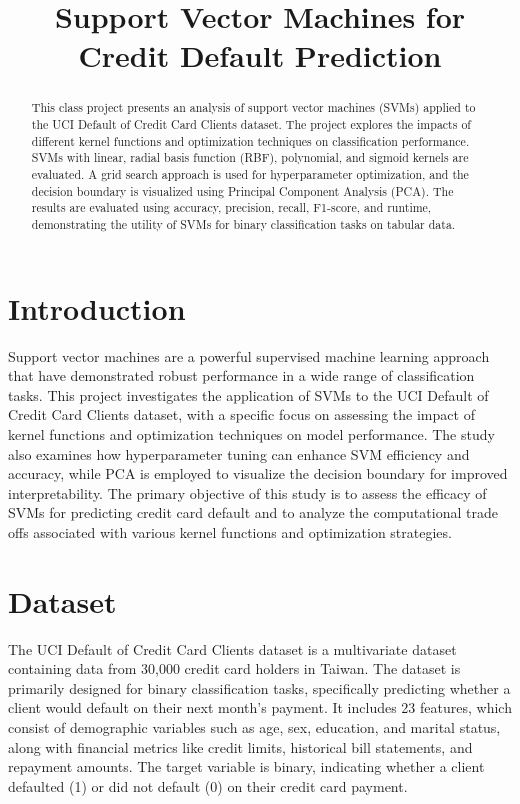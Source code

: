 \documentclass{article}
\begin{document}
\title{Support Vector Machines for Credit Default Prediction}


\maketitle

\begin{abstract}
This class project presents an analysis of support vector machines (SVMs) applied to the UCI Default of Credit Card Clients dataset. 
The project explores the impacts of different kernel functions and optimization techniques on classification performance. 
SVMs with linear, radial basis function (RBF), polynomial, and sigmoid kernels are evaluated. 
A grid search approach is used for hyperparameter optimization, and the decision boundary is visualized using Principal Component Analysis (PCA). 
The results are evaluated using accuracy, precision, recall, F1-score, and runtime, demonstrating the utility of SVMs for binary classification tasks on tabular data.
\end{abstract}

\section{Introduction}
Support vector machines are a powerful supervised machine learning approach that have demonstrated robust performance in a wide range of classification tasks. 
This project investigates the application of SVMs to the UCI Default of Credit Card Clients dataset, with a specific focus on assessing the impact of kernel functions 
and optimization techniques on model performance. The study also examines how hyperparameter tuning can enhance SVM efficiency and accuracy, while PCA is employed to 
visualize the decision boundary for improved interpretability. The primary objective of this study is to assess the efficacy of SVMs for predicting credit card default 
and to analyze the computational trade offs associated with various kernel functions and optimization strategies.


\section{Dataset}

The UCI Default of Credit Card Clients dataset is a multivariate dataset containing data from 30,000 credit card holders in Taiwan. 
The dataset is primarily designed for binary classification tasks, specifically predicting whether a client would default on their next month's payment. 
It includes 23 features, which consist of demographic variables such as age, sex, education, and marital status, along with financial metrics like credit limits, 
historical bill statements, and repayment amounts. The target variable is binary, indicating whether a client defaulted (1) or did not default (0) on their credit card payment. 
\end{document}
